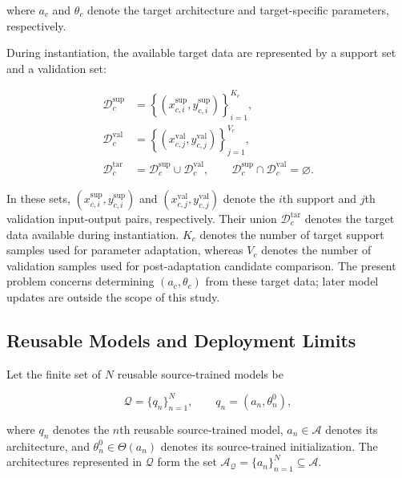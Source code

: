\documentclass[a4paper,fleqn]{cas-sc}
\begin{document}
where \(a_c\) and \(\theta_c\) denote the target architecture and target-specific parameters, respectively.

During instantiation, the available target data are represented by a support
set and a validation set:

\begin{equation}
\begin{aligned}
\mathcal{D}_{c}^{\mathrm{sup}}
&=
\left\{
(x_{c,i}^{\mathrm{sup}},y_{c,i}^{\mathrm{sup}})
\right\}_{i=1}^{K_c},
\\
\mathcal{D}_{c}^{\mathrm{val}}
&=
\left\{
(x_{c,j}^{\mathrm{val}},y_{c,j}^{\mathrm{val}})
\right\}_{j=1}^{V_c},
\\
\mathcal{D}_{c}^{\mathrm{tar}}
&=
\mathcal{D}_{c}^{\mathrm{sup}}
\cup
\mathcal{D}_{c}^{\mathrm{val}},
\qquad
\mathcal{D}_{c}^{\mathrm{sup}}
\cap
\mathcal{D}_{c}^{\mathrm{val}}
=
\varnothing .
\end{aligned}
\label{eq:target-data}
\end{equation}

In these sets,
$(x_{c,i}^{\mathrm{sup}},y_{c,i}^{\mathrm{sup}})$ and
$(x_{c,j}^{\mathrm{val}},y_{c,j}^{\mathrm{val}})$ denote the $i$th support
and $j$th validation input-output pairs, respectively. Their union
$\mathcal{D}_{c}^{\mathrm{tar}}$ denotes the target data available during
instantiation. $K_c$ denotes the number of target support samples used for
parameter adaptation, whereas $V_c$ denotes the number of validation samples
used for post-adaptation candidate comparison. The present problem concerns
determining $(a_c,\theta_c)$ from these target data; later model updates are
outside the scope of this study.

\subsection{Reusable Models and Deployment Limits}

Let the finite set of $N$ reusable source-trained models be

\begin{equation}
\mathcal{Q}=\{q_n\}_{n=1}^{N},
\qquad
q_n=(a_n,\theta_n^0),
\label{eq:reusable-models}
\end{equation}

where $q_n$ denotes the $n$th reusable source-trained model,
$a_n\in\mathcal{A}$ denotes its architecture, and
$\theta_n^0\in\Theta(a_n)$ denotes its source-trained initialization. The
architectures represented in $\mathcal{Q}$ form the set
$\mathcal{A}_{\mathcal{Q}}=\{a_n\}_{n=1}^{N}\subseteq\mathcal{A}$.
\end{document}
